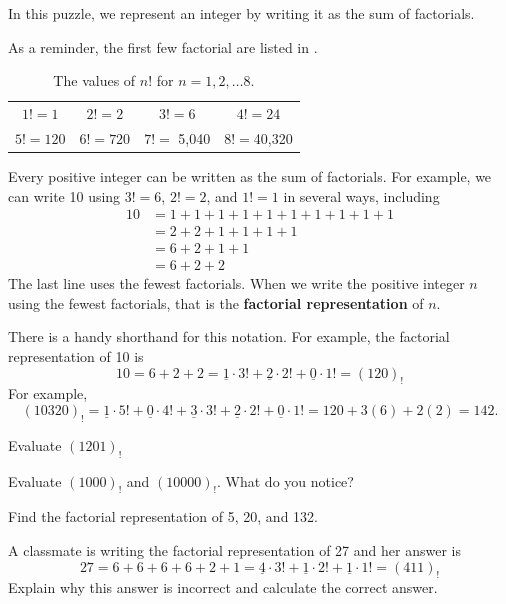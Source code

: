 In this puzzle, we represent an integer by writing it as the sum of factorials.  
\begin{act}
\label{act_fact_rep}
    As a reminder, the first few factorial are listed in .

        \begin{table}[hbtp]
            \centering
            \begin{tabular}{cccc}
                $1! = 1$ & $2! = 2$ & $3! = 6$ & $4! = 24$ \\
                $5! = 120$ & $6! = 720$ & $7! =$ 5,040 & $8! = $40,320
            \end{tabular}
            \caption{The values of $n!$ for $n=1,2, \ldots 8$.}
            \label{tab_factorials_1to8}
        \end{table}
    Every positive integer can be written as the sum of factorials. For example, we can write 10 using $3!=6$, $2!=2$, and $1!=1$ in several ways, including
        \begin{align*}
            10 &= 1 + 1 + 1 + 1 + 1 + 1 + 1 + 1 + 1 + 1  \\
            &= 2 + 2 + 1 + 1 + 1 + 1  \\
            &= 6 + 2 + 1 + 1 \\
            &= 6 + 2 + 2    
        \end{align*}
    The last line uses the fewest factorials.  When we write the positive integer $n$ using the fewest factorials, that is the \textbf{factorial representation} of $n$. 

    There is a handy shorthand for this notation.  For example, the factorial representation of 10 is
        $$10 = 6 + 2 + 2 = \underline{1} \cdot 3! + \underline{2} \cdot 2! + \underline{0} \cdot 1! =(120)_!$$
    For example, 
        $$(10320)_! 
        = \underline{1} \cdot 5!
        + \underline{0} \cdot 4!
        + \underline{3} \cdot 3!
        + \underline{2} \cdot 2!
        + \underline{0} \cdot 1!
        = 120 + 3(6) + 2(2) = 142.$$

    \begin{actpart} 
        \item Evaluate $(1201)_!$ %
        \item Evaluate $(1000)_!$ and $(10000)_!$.  What do you notice?
        \item Find the factorial representation of 5, 20, and 132.
        
        \item  A classmate is writing the factorial representation of 27 and her answer is 
            $$ 27 
            = 6 + 6 + 6 + 6 + 2 + 1 
            = \underline{4} \cdot 3! + \underline{1} \cdot 2! + \underline{1}\cdot 1! 
            = (411)_!$$ 
        Explain why this answer is incorrect and calculate the correct answer.  


\end{actpart}
\end{act}
